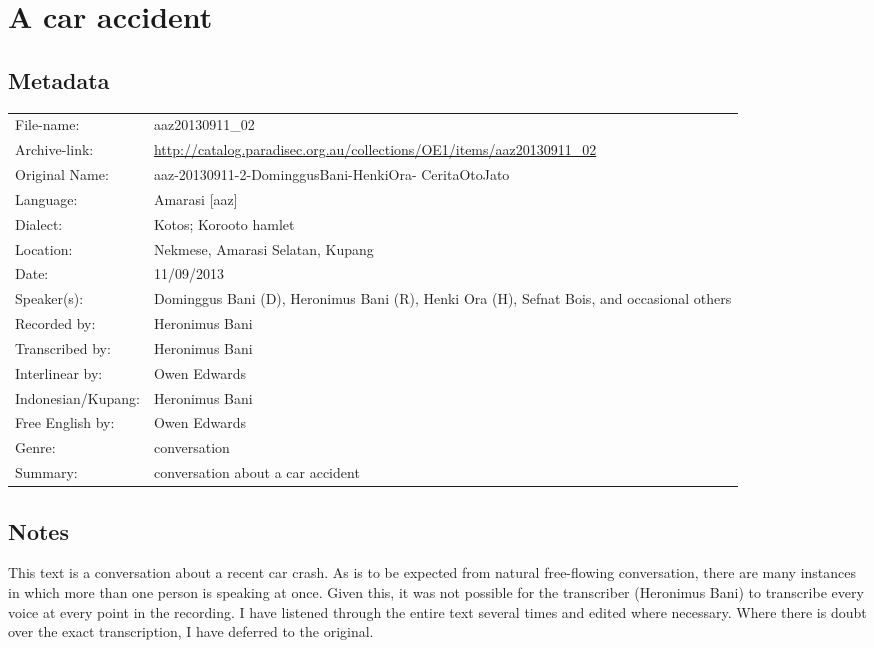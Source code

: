 \section{A car accident}\label{sec:CarCrash}
\subsection{Metadata}

\wg\begin{tabular}{lL{.67\textwidth}}
File-name:					& aaz20130911{\_}02\\
Archive-link:				& \url{http://catalog.paradisec.org.au/collections/OE1/items/aaz20130911_02}\\
Original Name:			& aaz-20130911-2-DominggusBani-HenkiOra- CeritaOtoJato\\
Language:						& Amarasi [aaz] \\
Dialect:						& Kotos; Koro{\Q}oto hamlet \\
Location:						& Nekmese{\Q}, Amarasi Selatan, Kupang \\
Date:								&	11/09/2013\\
Speaker(s):					& Dominggus Bani (D), Heronimus Bani (R), Henki Ora (H), Sefnat Bois, and occasional others\\
Recorded by: 				& Heronimus Bani\\
Transcribed by:			& Heronimus Bani\\
Interlinear by:			& Owen Edwards \\
Indonesian/Kupang:	& Heronimus Bani\\
Free English by:		& Owen Edwards\\
Genre:							& conversation\\
Summary:						& conversation about a car accident\\
\end{tabular}

\subsection{Notes}
This text is a conversation about a recent car crash.
As is to be expected from natural free-flowing conversation,
there are many instances in which more than one person is speaking at once.
Given this, it was not possible for the transcriber (Heronimus Bani)
to transcribe every voice at every point in the recording.
I have listened through the entire text several times and edited where necessary.
Where there is doubt over the exact transcription,
I have deferred to the original.

